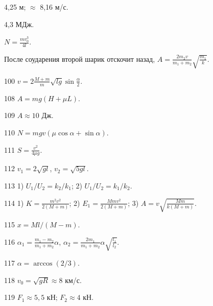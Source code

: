 \begin{Answer}{96}
4,25 м; $\approx$ 8,16 м/с.
\end{Answer}
\begin{Answer}{97}
4,3 МДж.
\end{Answer}
\begin{Answer}{98}
$N =\frac{mv_{0}^3}{4l}$.
\end{Answer}
\begin{Answer}{99}
После соударения второй шарик отскочит назад, $A = \frac{2m_2v}{m_1+m_2}\sqrt{\frac{m_1}{k}}$.
\end{Answer}
\begin{Answer}{100}
$v = 2\frac{M+m}{m}\sqrt{lg}\sin \frac{\alpha}{2}$.
\end{Answer}
\begin{Answer}{108}
$A=mg(H+\mu L)$.
\end{Answer}
\begin{Answer}{109}
$A \approx 10$ Дж.
\end{Answer}
\begin{Answer}{110}
$N = mgv(\mu \cos \alpha +\sin \alpha)$.
\end{Answer}
\begin{Answer}{111}
$S = \frac{v^2}{4 \mu g}$.
\end{Answer}
\begin{Answer}{112}
$v_1 = 2\sqrt{gl}$, $v_2 = \sqrt{5gl}$.
\end{Answer}
\begin{Answer}{113}
1) $U_1/U_2 = k_2/k_1$; 2) $U_1/U_2 = k_1/k_2$.
\end{Answer}
\begin{Answer}{114}
1) $K=\frac{m^2v^2}{2(M+m)}$; 2) $E_1 = \frac{Mmv^2}{2(M+m)}$; 3) $A = v\sqrt{\frac{Mm}{k(M+m)}}$.
\end{Answer}
\begin{Answer}{115}
$x = Ml/(M-m)$.
\end{Answer}
\begin{Answer}{116}
$\alpha_1 =\frac{m_1-m_2}{m_1+m_2}\alpha$, $\alpha_2 =\frac{2m_1}{m_1+m_2}\alpha \sqrt{\frac{l_1}{l_2}}$.
\end{Answer}
\begin{Answer}{117}
$\alpha = \arccos(2/3)$.
\end{Answer}
\begin{Answer}{118}
$v_0 = \sqrt{gR} \approx 8$ км/с.
\end{Answer}
\begin{Answer}{119}
$F_1 \approx 5,5$ кН; $F_2 \approx 4$ кН.
\end{Answer}
